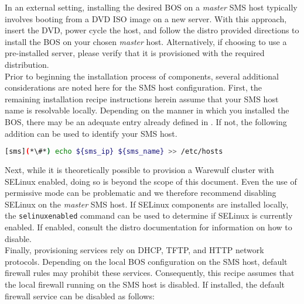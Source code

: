 In an external setting, installing the desired BOS on a
{\em master} SMS host typically involves booting from a DVD ISO image on a new
server. With this approach, insert the \baseOS{} DVD, power cycle the host, and
follow the distro provided directions to install the BOS on your chosen {\em
master} host.  Alternatively, if choosing to use a pre-installed server, please
verify that it is provisioned with the required \baseOS{} distribution. \\

Prior to beginning the installation process of \OHPC{} components, several additional
considerations are noted here for the SMS host configuration. First, 
the remaining installation recipe instructions herein assume that
your SMS host name is resolvable locally. Depending on the manner in which you
installed the BOS, there may be an adequate entry already defined
in . If not, the following addition can be used to identify
your SMS host.
\begin{lstlisting}[language=bash,keywords={}]
[sms](*\#*) echo ${sms_ip} ${sms_name} >> /etc/hosts
\end{lstlisting}

Next, while it is theoretically possible to provision a Warewulf cluster with SELinux
enabled, doing so is beyond the scope of this document. Even the use of
permissive mode can be problematic and we therefore recommend disabling SELinux on the {\em
master} SMS host. If SELinux components are installed locally,
the \texttt{selinuxenabled} command can be used to determine if SELinux is
currently enabled. If enabled, consult the distro documentation for information
on how to disable. \\

Finally, provisioning services rely on DHCP, TFTP, and HTTP network protocols.
Depending on the local BOS configuration on the SMS host, default firewall
rules may prohibit these services. Consequently, this recipe assumes that the local
firewall running on the SMS host is disabled. If installed, the default
firewall service can be disabled as follows:
